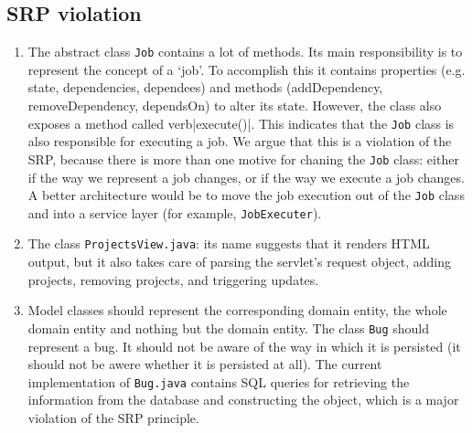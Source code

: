 \documentclass{article}
\begin{document}
\subsection{SRP violation}
\begin{enumerate}
\item The abstract class \verb|Job| contains a lot of methods. Its main responsibility is to represent the concept of a `job'. To accomplish this it contains properties (e.g. state, dependencies, dependees) and methods (addDependency, removeDependency, dependsOn) to alter its state. However, the class also exposes a method called verb|execute()|. This indicates that the \verb|Job| class is also responsible for executing a job. We argue that this is a violation of the SRP, because there is more than one motive for chaning the \verb|Job| class: either if the way we represent a job changes, or if the way we execute a job changes. A better architecture would be to move the job execution out of the \verb|Job| class and into a service layer (for example, \verb|JobExecuter|).


\item The class \verb|ProjectsView.java|: its name suggests that it renders HTML output, but it also takes care of parsing the servlet's request object, adding projects, removing projects, and triggering updates.

\item Model classes should represent the corresponding domain entity, the whole domain entity and nothing but the domain entity. The class \verb|Bug| should represent a bug. It should not be aware of the way in which it is persisted (it should not be awere whether it is persisted at all). The current implementation of \verb|Bug.java| contains SQL queries for retrieving the information from the database and constructing the object, which is a major violation of the SRP principle.

\end{enumerate}
\end{document}
